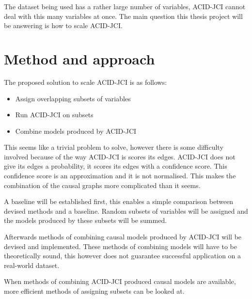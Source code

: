 \documentclass[11pt]{article}
\begin{document}
The dataset being used has a rather large number of variables, ACID-JCI cannot deal with this many variables at once. The main question this thesis project will be answering is how to scale ACID-JCI.






\section{Method and approach}
The proposed solution to scale ACID-JCI is as follows:
\begin{itemize}
    \item Assign overlapping subsets of variables
    \item Run ACID-JCI on subsets
    \item Combine models produced by ACID-JCI
\end{itemize}

This seems like a trivial problem to solve, however there is some difficulty involved because of the way ACID-JCI is scores its edges. ACID-JCI does not give its edges a probability, it scores its edges with a confidence score. This confidence score is an approximation and it is not normalised. This makes the combination of the causal graphs more complicated than it seems.

A baseline will be established first, this enables a simple comparison between devised methods and a baseline. Random subsets of variables will be assigned and the models produced by these subsets will be summed.

Afterwards methods of combining causal models produced by ACID-JCI will be devised and implemented. These methods of combining models will have to be theoretically sound, this however does not guarantee successful application on a real-world dataset.

When methods of combining ACID-JCI produced causal models are available, more efficient methods of assigning subsets can be looked at.
\end{document}
